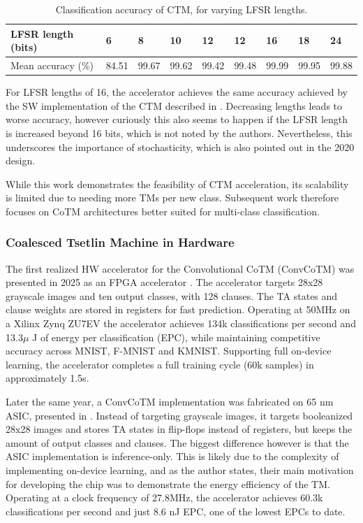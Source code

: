 \begin{table}[H]
\centering

\caption{Classification accuracy of CTM, for varying LFSR lengths.}
\label{tab:lfsrlengths}
\begin{tabular}{l|llllllll}
\hline
LFSR length (bits)      & 6      & 8      & 10    & 12    & 12    & 16    & 18    & 24    \\ \hline
Mean accuracy (\%) & 84.51 & 99.67 & 99.62 & 99.42 & 99.48 & 99.99 & 99.95 & 99.88 \\ \hline
\end{tabular}
\end{table}


For LFSR lengths of 16, the accelerator achieves the same accuracy achieved by the SW implementation of the CTM described in \cite{GranmoOle-Christoffer2019TCTM}. Decreasing lengths leads to worse accuracy, however curiously this also seems to happen if the LFSR length is increased beyond 16 bits, which is not noted by the authors. Nevertheless, this underscores the importance of stochasticity, which is also pointed out in the 2020 design.

While this work demonstrates the feasibility of CTM acceleration, its scalability is limited due to needing more TMs per new class. Subsequent work therefore focuses on CoTM architectures better suited for multi-class classification.

\subsubsection{Coalesced Tsetlin Machine in Hardware}

The first realized HW accelerator for the Convolutional CoTM (ConvCoTM) was presented in 2025 as an FPGA accelerator \cite{TunheimSveinAnders2025TMIC}. The accelerator targets 28x28 grayscale images and ten output classes, with 128 clauses. The TA states and clause weights are stored in registers for fast prediction. Operating at 50MHz on a Xilinx Zynq ZU7EV the accelerator achieves 134k classifications per second and 13.3$\mu$ J of energy per classification (EPC), while maintaining competitive accuracy across MNIST, F-MNIST and KMNIST. Supporting full on-device learning, the accelerator completes a full training cycle (60k samples) in approximately 1.5s. 

Later the same year, a ConvCoTM implementation was fabricated on 65 nm ASIC, presented in \cite{AndersTunheimSvein2025AA86}. Instead of targeting grayscale images, it targets booleanized 28x28 images and stores TA states in flip-flops instead of registers, but keeps the amount of output classes and clauses. The biggest difference however is that the ASIC implementation is inference-only. This is likely due to the complexity of implementing on-device learning, and as the author states, their main motivation for developing the chip was to demonstrate the energy efficiency of the TM. Operating at a clock frequency of 27.8MHz, the accelerator achieves 60.3k classifications per second and just 8.6 nJ EPC, one of the lowest EPCs to date.

